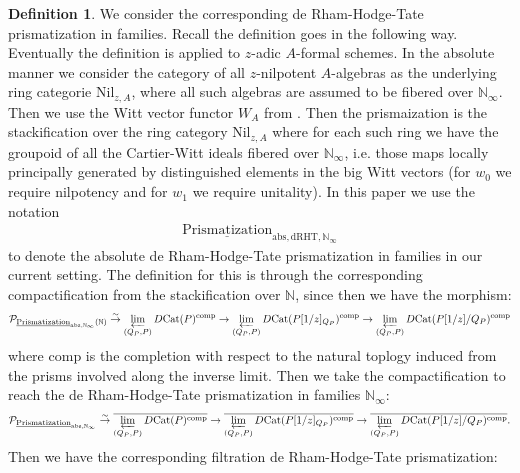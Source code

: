 \documentclass[12pt]{article}
\theoremstyle{definition}
\newtheorem{definition}{Definition}
\begin{document}
\begin{definition}
We consider the corresponding de Rham-Hodge-Tate prismatization in families. Recall the definition goes in the following way. Eventually the definition is applied to $z$-adic $A$-formal schemes. In the absolute manner we consider the category of all $z$-nilpotent $A$-algebras as the underlying ring categorie $\mathrm{Nil}_{z,A}$, where all such algebras are assumed to be fibered over $\mathbb{N}_\infty$. Then we use the Witt vector functor $W_A$ from \cite{3LH}. Then the prismaization is the stackification over the ring category $\mathrm{Nil}_{z,A}$ where for each such ring we have the groupoid of all the Cartier-Witt ideals fibered over $\mathbb{N}_\infty$, i.e. those maps locally principally generated by distinguished elements in the big Witt vectors (for $w_0$ we require nilpotency and for $w_1$ we require unitality). In this paper we use the notation 
\begin{align}
\underline{\mathrm{Prismatization}}_{\mathrm{abs},\mathrm{dRHT},\mathbb{N}_\infty}
\end{align}
to denote the absolute de Rham-Hodge-Tate prismatization in families in our current setting. The definition for this is through the corresponding compactification from the stackification over $\mathbb{N}$, since then we have the morphism:
\begin{align}
\mathcal{P}_{\underline{\mathrm{Prismatization}}_{\mathrm{abs},\mathbb{N}_\infty}(\mathbb{N})} \overset{\sim}{\rightarrow} \varprojlim_{(Q_P,P)} D\mathrm{Cat}(P)^\mathrm{comp}\rightarrow \varprojlim_{(Q_P,P)} D\mathrm{Cat}(P[1/z]_{Q_P})^\mathrm{comp}\rightarrow \varprojlim_{(Q_P,P)} D\mathrm{Cat}(P[1/z]/{Q_P})^\mathrm{comp}
\end{align}
where $\mathrm{comp}$ is the completion with respect to the natural toplogy induced from the prisms involved along the inverse limit. Then we take the compactification to reach the de Rham-Hodge-Tate prismatization in families $\mathbb{N}_\infty$:
\begin{align}
\mathcal{P}_{\underline{\mathrm{Prismatization}}_{\mathrm{abs},\mathbb{N}_\infty}} \overset{\sim}{\rightarrow} \overline{\varprojlim_{(Q_P,P)} D\mathrm{Cat}(P)^\mathrm{comp}}\rightarrow \overline{\varprojlim_{(Q_P,P)} D\mathrm{Cat}(P[1/z]_{Q_P})^\mathrm{comp}}\rightarrow \overline{\varprojlim_{(Q_P,P)} D\mathrm{Cat}(P[1/z]/{Q_P})^\mathrm{comp}}.
\end{align}
Then we have the corresponding filtration de Rham-Hodge-Tate prismatization:
\begin{align}

\end{align}
\end{definition}
\end{document}

